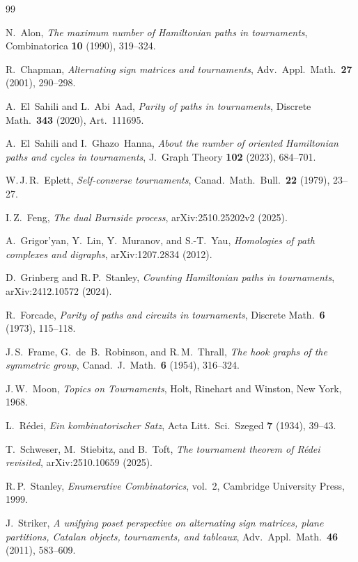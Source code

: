 \documentclass[12pt,reqno]{amsart}
\theoremstyle{plain}
\theoremstyle{definition}
\theoremstyle{remark}
\begin{document}
\begin{thebibliography}{99}

N.~Alon,
\emph{The maximum number of Hamiltonian paths in tournaments},
Combinatorica \textbf{10} (1990), 319--324.

R.~Chapman,
\emph{Alternating sign matrices and tournaments},
Adv.\ Appl.\ Math.\ \textbf{27} (2001), 290--298.

A.~El~Sahili and L.~Abi~Aad,
\emph{Parity of paths in tournaments},
Discrete Math.\ \textbf{343} (2020), Art.~111695.

A.~El~Sahili and I.~Ghazo~Hanna,
\emph{About the number of oriented Hamiltonian paths and cycles in tournaments},
J.\ Graph Theory \textbf{102} (2023), 684--701.

W.\,J.\,R.~Eplett,
\emph{Self-converse tournaments},
Canad.\ Math.\ Bull.\ \textbf{22} (1979), 23--27.

I.\,Z.~Feng,
\emph{The dual Burnside process},
arXiv:2510.25202v2 (2025).

A.~Grigor'yan, Y.~Lin, Y.~Muranov, and S.-T.~Yau,
\emph{Homologies of path complexes and digraphs},
arXiv:1207.2834 (2012).

D.~Grinberg and R.\,P.~Stanley,
\emph{Counting Hamiltonian paths in tournaments},
arXiv:2412.10572 (2024).

R.~Forcade,
\emph{Parity of paths and circuits in tournaments},
Discrete Math.\ \textbf{6} (1973), 115--118.

J.\,S.~Frame, G.\ de~B.\ Robinson, and R.\,M.~Thrall,
\emph{The hook graphs of the symmetric group},
Canad.\ J.\ Math.\ \textbf{6} (1954), 316--324.

J.\,W.~Moon,
\emph{Topics on Tournaments},
Holt, Rinehart and Winston, New York, 1968.

L.~Rédei,
\emph{Ein kombinatorischer Satz},
Acta Litt.\ Sci.\ Szeged \textbf{7} (1934), 39--43.

T.~Schweser, M.~Stiebitz, and B.~Toft,
\emph{The tournament theorem of Rédei revisited},
arXiv:2510.10659 (2025).

R.\,P.~Stanley,
\emph{Enumerative Combinatorics}, vol.~2,
Cambridge University Press, 1999.

J.~Striker,
\emph{A unifying poset perspective on alternating sign matrices, plane partitions,
Catalan objects, tournaments, and tableaux},
Adv.\ Appl.\ Math.\ \textbf{46} (2011), 583--609.

\end{thebibliography}
\end{document}
